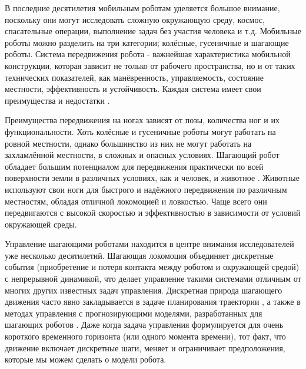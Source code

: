 {\actuality} 

В последние десятилетия мобильным роботам уделяется большое внимание, поскольку они могут исследовать сложную окружающую среду, космос, спасательные операции, выполнение задач без участия человека и т.д. Мобильные роботы можно разделить на три категории; колёсные, гусеничные и шагающие роботы. Система передвижения робота - важнейшая характеристика мобильной конструкции, которая зависит не только от рабочего пространства, но и от таких технических показателей, как манёвренность, управляемость, состояние местности, эффективность и устойчивость. Каждая система имеет свои преимущества и недостатки \cite{zhong2019}.

Преимущества передвижения на ногах зависят от позы, количества ног и их функциональности. Хоть колёсные и гусеничные роботы могут работать на ровной местности, однако большинство из них не могут работать на захламлённой местности, в сложных и опасных условиях. Шагающий робот обладает большим потенциалом для передвижения практически по всей поверхности земли в различных условиях, как и человек, и животное \cite{Silva2012}. Животные используют свои ноги для быстрого и надёжного передвижения по различным местностям, обладая отличной локомоцией и ловкостью. Чаще всего они передвигаются с высокой скоростью и эффективностью в зависимости от условий окружающей среды.

Управление шагающими роботами находится в центре внимания исследователей уже несколько десятилетий. Шагающая локомоция объединяет дискретные события (приобретение и потеря контакта между роботом и окружающей средой) с непрерывной динамикой, что делает управление такими системами отличным от многих других известных задач управления. Дискретная природа шагающего движения часто явно закладывается в задаче планирования траектории \cite{katayama2022whole, lu2023whole}, а также в методах управления с прогнозирующими моделями, разработанных для шагающих роботов \cite{KIM2019, chignoli2021humanoid}. Даже когда задача управления формулируется для очень короткого временного горизонта (или одного момента времени), тот факт, что движение включает дискретные шаги, меняет и ограничивает предположения, которые мы можем сделать о модели робота.


